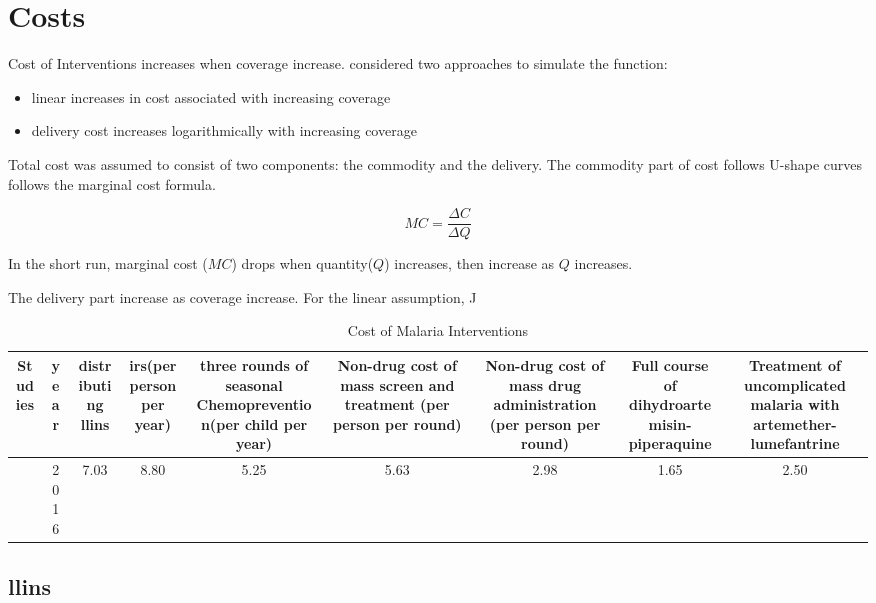 \documentclass[a4paper, 12pt, twoside]{article}
\begin{document}
\section{Costs}
Cost of Interventions increases when coverage increase.\cite{Winskill2017a} considered two approaches to simulate the function:
\begin{itemize}
	\item linear increases in cost associated with increasing coverage
	\item delivery cost increases logarithmically with increasing coverage
\end{itemize}

Total cost was assumed to consist of two components: the commodity and the delivery. The commodity part of cost follows U-shape curves follows the marginal cost formula.

$$ MC = \frac{\Delta C}{\Delta Q} $$

In the short run, marginal cost ($MC$) drops when quantity($Q$) increases, then increase as $Q$ increases.

The delivery part increase as coverage increase. For the linear assumption, J

\begin{table}[htpb]
	\centering
	\caption{Cost of Malaria Interventions}
	\label{tab:cost_of_malaria_interventions}
	{\small
		\begin{tabular}{cSSSSSSSS}
			\toprule
			Studies           & {year} & {distributing \gls{llins}} & {\gls{irs}(per person per year)} & {three rounds of seasonal Chemoprevention(per child per year) } & {Non-drug cost of mass screen and treatment (per person per round)} & {Non-drug cost of mass drug administration (per person per round) } & {Full course of dihydroartemisin-piperaquine} & {Treatment of uncomplicated malaria with artemether-lumefantrine} \\
			\midrule
			\cite{Walker2016} & 2016   & 7.03                       & 8.80                             & 5.25                                                            & 5.63                                                                & 2.98                                                                & 1.65                                          & 2.50                                                              \\
			\bottomrule
		\end{tabular}
	}
\end{table}

\subsection{\gls{llins}}
\end{document}
